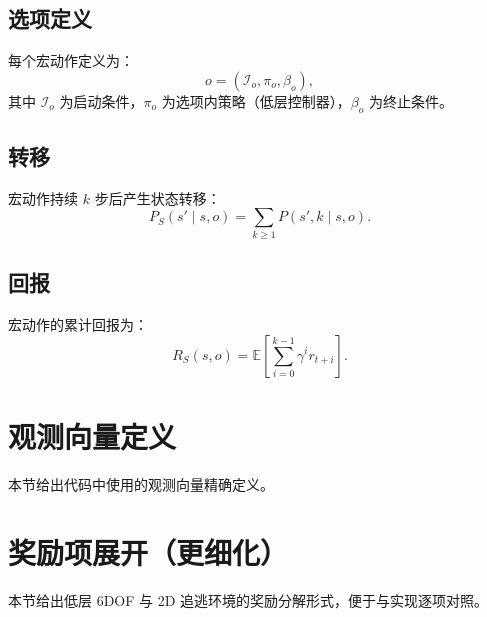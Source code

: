 \documentclass[11pt]{article}
\begin{document}
\subsection*{选项定义}
每个宏动作定义为：
\begin{equation}
 o = (\mathcal{I}_o, \pi_o, \beta_o),
\end{equation}
其中 $\mathcal{I}_o$ 为启动条件，$\pi_o$ 为选项内策略（低层控制器），$\beta_o$ 为终止条件。

\subsection*{转移}
宏动作持续 $k$ 步后产生状态转移：
\begin{equation}
 P_S(s'\mid s,o) = \sum_{k\ge 1} P(s', k \mid s, o).
\end{equation}

\subsection*{回报}
宏动作的累计回报为：
\begin{equation}
 R_S(s,o) = \mathbb{E}\left[\sum_{i=0}^{k-1}\gamma^i r_{t+i}\right].
\end{equation}

\section{观测向量定义}
本节给出代码中使用的观测向量精确定义。

\section{奖励项展开（更细化）}
本节给出低层 6DOF 与 2D 追逃环境的奖励分解形式，便于与实现逐项对照。
\end{document}

